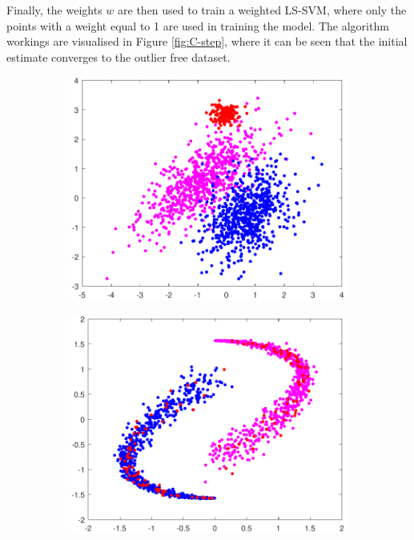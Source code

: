 \documentclass[preprint,12pt]{elsarticle}
\begin{document}
	Finally, the weights $w$ are then used to train a weighted LS-SVM, where only the points with a weight equal to 1 are used in training the model. The algorithm workings are visualised in Figure \ref{fig:C-step}, where it can be seen that the initial estimate converges to the outlier free dataset.
	
	
	\begin{figure}[!htb]
		\centering
		\begin{subfigure}[b]{0.40\linewidth}
			\centering\includegraphics[width=1\linewidth]{figures/kcstep/nddatamodel.pdf}
			\caption{\label{fig:dmodel1}} 
		\end{subfigure}
		\begin{subfigure}[b]{0.40\linewidth}
		\centering\includegraphics[width=1\linewidth]{figures/kcstep/yydatamodel.pdf}
		\caption{\label{fig:spatialmedc1}}
		\end{subfigure} \\


\end{figure}
\end{document}
